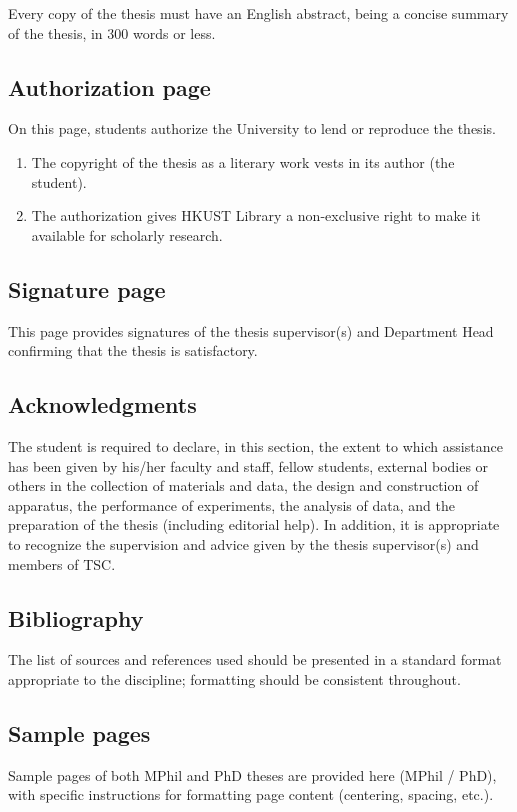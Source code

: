Every copy of the thesis must have an English abstract, being a concise summary of the thesis, in 300 words or less.

\subsection{Authorization page}

On this page, students authorize the University to lend or reproduce the thesis.

\begin{enumerate}
  \item The copyright of the thesis as a literary work vests in its author (the student).
  \item The authorization gives HKUST Library a non-exclusive right to make it available for scholarly research.
\end{enumerate}

\subsection{Signature page}

This page provides signatures of the thesis supervisor(s) and Department Head confirming that the thesis is satisfactory.

\subsection{Acknowledgments}

The student is required to declare, in this section, the extent to which assistance has been given by his/her faculty and staff, fellow students, external bodies or others in the collection of materials and data, the design and construction of apparatus, the performance of experiments, the analysis of data, and the preparation of the thesis (including editorial help). In addition, it is appropriate to recognize the supervision and advice given by the thesis supervisor(s) and members of TSC.

\subsection{Bibliography}

The list of sources and references used should be presented in a standard format appropriate to the discipline; formatting should be consistent throughout.

\subsection{Sample pages}
Sample pages of both MPhil and PhD theses are provided here (MPhil / PhD), with specific instructions for formatting page content (centering, spacing, etc.).

